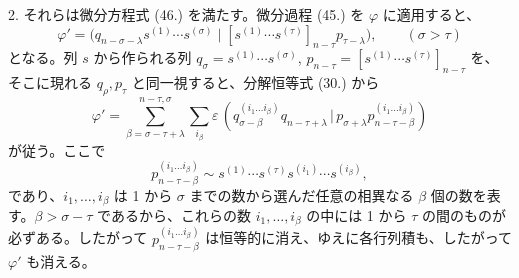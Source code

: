 \documentclass[11pt]{article}
\newcommand{\pair}[2]{(#1\,|\,#2)}
\newcommand{\eps}{\varepsilon}
\begin{document}
2. それらは微分方程式 (46.) を満たす。微分過程 (45.) を $\varphi$ に適用すると、
\[
 \varphi'=\bigl(q_{n-\sigma-\lambda}s^{(1)}\cdots s^{(\sigma)}\mid [s^{(1)}\cdots s^{(\tau)}]_{n-\tau}p_{\tau-\lambda}\bigr),\qquad (\sigma>\tau)
\]
となる。列 $s$ から作られる列 $q_\sigma=s^{(1)}\cdots s^{(\sigma)}$, $p_{n-\tau}=[s^{(1)}\cdots s^{(\tau)}]_{n-\tau}$ を、そこに現れる $q_\rho,p_\tau$ と同一視すると、分解恒等式 (30.) から
\[
 \varphi'=\sum_{\beta=\sigma-\tau+\lambda}^{n-\tau,\sigma}\sum_{i_\beta}\eps\,
 \pair{q_{\sigma-\beta}^{(i_1\ldots i_\beta)}q_{n-\tau+\lambda}}{p_{\sigma+\lambda}p_{n-\tau-\beta}^{(i_1\ldots i_\beta)}}
\]
が従う。ここで
\[
 p_{n-\tau-\beta}^{(i_1\ldots i_\beta)}\sim s^{(1)}\cdots s^{(\tau)}s^{(i_1)}\cdots s^{(i_\beta)},
\]
であり、$i_1,\ldots,i_\beta$ は 1 から $\sigma$ までの数から選んだ任意の相異なる $\beta$ 個の数を表す。$\beta>\sigma-\tau$ であるから、これらの数 $i_1,\ldots,i_\beta$ の中には 1 から $\tau$ の間のものが必ずある。したがって $p_{n-\tau-\beta}^{(i_1\ldots i_\beta)}$ は恒等的に消え、ゆえに各行列積も、したがって $\varphi'$ も消える。
\end{document}
